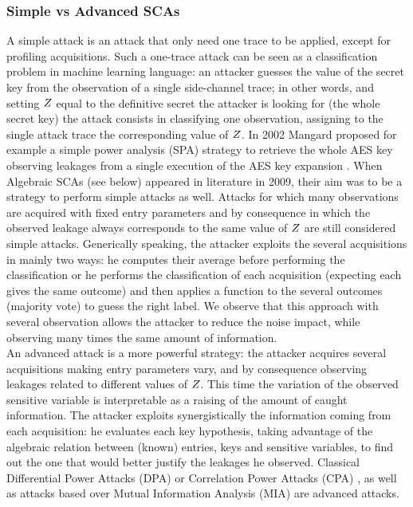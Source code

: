 \subsubsection{Simple vs Advanced SCAs}
A simple attack is an attack that only need one trace to be applied, except for profiling acquisitions. Such a one-trace attack can be seen as a classification problem in machine learning language: an attacker guesses the value of the secret key from the observation of a single side-channel trace;  in other words, and setting $Z$ equal to the definitive secret the attacker is looking for (\eg the whole secret key) the attack consists in classifying one observation, \ie assigning to the single attack trace the corresponding value of $Z$. In 2002 Mangard \etal proposed for example a simple power analysis (SPA) strategy to retrieve the whole AES key observing leakages from a single execution of the AES key expansion \cite{mangard2002simple}. When Algebraic SCAs (see below) appeared in literature in 2009, their aim was to be a strategy to perform simple attacks as well.  Attacks for which many observations are acquired with fixed entry parameters and by consequence in which the observed leakage always corresponds to the same value of $Z$ are still considered simple attacks. Generically speaking, the attacker exploits the several acquisitions in mainly two ways: he computes their average before performing the classification or he performs the classification of each acquisition (expecting each gives the same outcome) and then applies a function to the several outcomes (\eg majority vote) to guess the right label. We observe that this approach with several observation allows the attacker to reduce the noise impact, while observing many times the same amount of information.\\
An advanced attack is a more powerful strategy: the attacker acquires several acquisitions making entry parameters vary, and by consequence observing leakages related to different values of $Z$. This time the variation of the observed sensitive variable is interpretable as a raising of the amount of caught information. The attacker exploits synergistically the information coming from each acquisition: he evaluates each key hypothesis, taking advantage of the algebraic relation between (known) entries, keys and sensitive variables, to find out the one that would better justify the leakages he observed. Classical Differential Power Attacks (DPA) \cite{brier2004correlation} or Correlation Power Attacks (CPA) \cite{brier2004correlation}, as well as attacks based over Mutual Information Analysis (MIA) \cite{batina2011mutual} are advanced attacks. 


